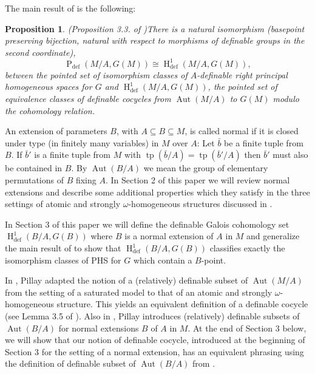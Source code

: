 \documentclass{article}
\theoremstyle{problemstyle}
\newtheorem{proposition}[problem]{Proposition}
\DeclareMathOperator{\defin}{def} %
\DeclareMathOperator{\tp}{tp} %
\DeclareMathOperator{\aut}{Aut} %
\DeclareMathOperator{\HH}{H} %
\DeclareMathOperator{\PP}{P} %
\begin{document}
The main result of \cite{pillay_1997} is the following: 

\begin{proposition}(Proposition 3.3. of \cite{pillay_1997})\label{PHS_cocycle_correspondence_aut(M/A)}
    There is a natural isomorphism (basepoint preserving bijection, natural with respect to morphisms of definable groups in the second coordinate), $$\PP_{\defin}(M/A,G(M)) \cong \HH^1_{\defin}(M/A,G(M)),$$ between the pointed set of isomorphism classes of $A$-definable right principal homogeneous spaces for $G$ and $\HH^1_{\defin}(M/A,G(M))$, the pointed set of equivalence classes of definable cocycles from $\aut(M/A)$ to $G(M)$ modulo the cohomology relation.
\end{proposition} 

An extension of parameters $B$, with $A \subseteq B \subseteq M$, is called normal if it is closed under type (in finitely many variables) in $M$ over $A$: Let $\bar{b}$ be a finite tuple from $B$. If $\bar{b}'$ is a finite tuple from $M$ with $\tp(\bar{b}/A) = \tp(\bar{b}'/A)$ then $\bar{b}'$ must also be contained in $B$. By $\aut(B/A)$ we mean the group of elementary permutations of $B$ fixing $A$. In Section 2 of this paper we will review normal extensions and describe some additional properties which they satisfy in the three settings of atomic and strongly $\omega$-homogeneous structures discussed in \cite{pillay_1997}. 

In Section 3 of this paper we will define the definable Galois cohomology set $\HH^1_{\defin}(B/A,G(B))$ where $B$ is a normal extension of $A$ in $M$ and generalize the main result of \cite{pillay_1997} to show that $\HH^1_{\defin}(B/A,G(B))$ classifies exactly the isomorphism classes of PHS for $G$ which contain a $B$-point. 

In \cite{pillay2024automorphism}, Pillay adapted the notion of a (relatively) definable subset of $\aut(M/A)$ from the setting of a saturated model to that of an atomic and strongly $\omega$-homogeneous structure. This yields an equivalent definition of a definable cocycle (see Lemma 3.5 of \cite{pillay2024automorphism}). Also in \cite{pillay2024automorphism}, Pillay introduces (relatively) definable subsets of $\aut(B/A)$ for normal extensions $B$ of $A$ in $M$. At the end of Section 3 below, we will show that our notion of definable cocycle, introduced at the beginning of Section 3 for the setting of a normal extension, has an equivalent phrasing using the definition of definable subset of $\aut(B/A)$ from \cite{pillay2024automorphism}. 
\end{document}
